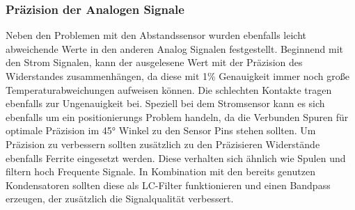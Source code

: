 \subsubsection{Präzision der Analogen Signale}
Neben den Problemen mit den Abstandssensor wurden ebenfalls leicht abweichende Werte in den anderen Analog Signalen festgestellt. Beginnend mit den Strom Signalen, kann der ausgelesene Wert mit der Präzision des Widerstandes zusammenhängen, da diese mit 1\% Genauigkeit immer noch große Temperaturabweichungen aufweisen können. Die schlechten Kontakte tragen ebenfalls zur Ungenauigkeit bei. Speziell bei dem Stromsensor kann es sich ebenfalls um ein positionierungs Problem handeln, da die Verbunden Spuren für optimale Präzision im 45° Winkel zu den Sensor Pins stehen sollten. Um Präzision zu verbessern sollten zusätzlich zu den Präzisieren Widerstände ebenfalls Ferrite eingesetzt werden. Diese verhalten sich ähnlich wie Spulen und filtern hoch Frequente Signale. In Kombination mit den bereits genutzen Kondensatoren sollten diese als LC-Filter funktionieren und einen Bandpass erzeugen, der zusätzlich die Signalqualität verbessert.\\
